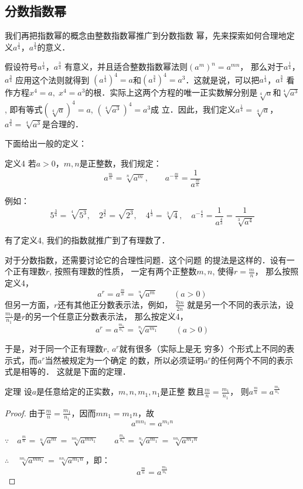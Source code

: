 \subsection{分数指数幂}
我们再把指数幂的概念由整数指数幂推广到分数指数
幂，先来探索如何合理地定义$a^{\tfrac{1}{4}}$，$a^{\tfrac{3}{4}}$的意义．

假设符号$a^{\tfrac{1}{4}}$，$a^{\tfrac{3}{4}}$
有意义，并且适合整数指数幂法则$(a^m)^n=a^{mn}$，
那么对于$a^{\tfrac{1}{4}}$，$a^{\tfrac{3}{4}}$
应用这个法则就得到
$\left(a^{\tfrac{1}{4}}\right)^4=a$和$\left(a^{\tfrac{3}{4}}\right)^4=a^3$．这就是说，可以把$a^{\tfrac{1}{4}}$，$a^{\tfrac{3}{4}}$
看作方程$x^4=a,\; x^4=a^3$的根．实际上这两个方程的唯一正实数解分别是$\sqrt[4]{a}$和$\sqrt[4]{a^3}$, 即有等式$\left(\sqrt[4]{a}\right)^4=a$, $\left(\sqrt[4]{a^3}\right)^4=a^3$成
立．因此，我们定义$a^{\tfrac{1}{4}}=\sqrt[4]{a}$，$a^{\tfrac{3}{4}}=\sqrt[4]{a^3}$是合理的．

下面给出一般的定义：
\begin{blk}{定义4}
若$a>0$，$m,n$是正整数，我们规定：
 \[a^{\tfrac{m}{n}}=\sqrt[n]{a^m},\qquad a^{-\tfrac{m}{n}}=\frac{1}{a^{\tfrac{m}{n}}}\]
\end{blk}

例如：
\[5^{\tfrac{3}{4}}=\sqrt[4]{5^3},\quad 2^{\tfrac{3}{2}}=\sqrt{2^3},\quad 4^{\tfrac{1}{3}}=\sqrt[3]{4},\quad a^{-\tfrac{4}{3}}=\frac{1}{a^{\tfrac{4}{3}}}=\frac{1}{\sqrt[3]{a^4}} \]

有了定义4, 我们的指数就推广到了有理数了．

对于分数指数，还需要讨论它的合理性问题．这个问题
的提法是这样的．设有一个正有理数$r$, 按照有理数的性质，
一定有两个正整数$m,n$, 使得$r=\frac{m}{n}$，
那么按照定义4，
\[a^r=a^{\tfrac{m}{n}}=\sqrt[n]{a^m}\qquad (a>0)\]
但另一方面，$r$还有其他正分数表示法，例如，
$\frac{2m}{2n}$
就是另一个不同的表示法，设
$\frac{m_1}{n_1}$是$r$的另一个任意正分数表示法，
那么按定义4，
\[a^r=a^{\tfrac{m_1}{n_1}}=\sqrt[n_1]{a^{m_1}}\qquad (a>0)\]

于是，对于同一个正有理数$r$, $a^r$就有很多（实际上是无
穷多）个形式上不同的表示式，而$a^r$当然被规定为一个确定
的数，所以必须证明$a^r$的任何两个不同的表示式是相等的．
这就是下面的定理．

\begin{blk}{定理}
    设$a$是任意给定的正实数，$m,n,m_1,n_1$是正整
    数且$\frac{m}{n}=\frac{m_1}{n_1}$，
    则$a^{\tfrac{m}{n}}=a^{\tfrac{m_1}{n_1}}$   
\end{blk}

\begin{proof}
由于$\frac{m}{n}=\frac{m_1}{n_1}$，因而$mn_1=m_1n$，故
\[a^{mn_1}=a^{m_1n}\]

$\because\quad a^{\tfrac{m}{n}}=\sqrt[n]{a^m}=\sqrt[nn_1]{a^{mn_1}}\qquad 
a^{\tfrac{m_1}{n_1}}=\sqrt[n_1]{a^{m_1}}=\sqrt[nn_1]{a^{m_1n}}$

$\therefore\quad \sqrt[nn_1]{a^{mn_1}}=\sqrt[nn_1]{a^{m_1n}}$，即：
\[a^{\tfrac{m}{n}}=a^{\tfrac{m_1}{n_1}}\]
\end{proof}
    
